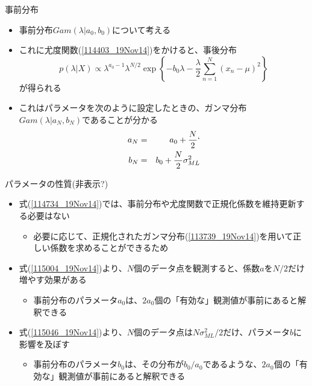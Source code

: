 \begin{frame}{事前分布}
 \begin{itemize}
  \item 事前分布$Gam(\lambda|a_0,b_0)$について考える
  \item これに尤度関数(\ref{114403_19Nov14})をかけると、事後分布
        \begin{equation}
         p(\lambda|X) \propto \lambda^{a_0-1}\lambda^{N/2}\exp\left\{-b_0\lambda-\frac{\lambda}{2}\sum_{n=1}^{N}(x_n-\mu)^2\right\}\label{114734_19Nov14}
        \end{equation}
        が得られる
  \item これはパラメータを次のように設定したときの、ガンマ分布$Gam(\lambda|a_N,b_N)$であることが分かる
        \begin{eqnarray}
         a_N&=& a_0 + \frac{N}{2}`\label{115004_19Nov14}\\
         b_N%
         &= & b_0+\frac{N}{2}\sigma^2_{ML}\label{115046_19Nov14}
        \end{eqnarray}
 \end{itemize}
\end{frame}

\begin{frame}{パラメータの性質(非表示?)}
 \begin{itemize}
  \item 式(\ref{114734_19Nov14})では、事前分布や尤度関数で正規化係数を維持更新する必要はない
        \begin{itemize}
         \item 必要に応じて、正規化されたガンマ分布(\ref{113739_19Nov14})を用いて正しい係数を求めることができるため
        \end{itemize}
  \item 式(\ref{115004_19Nov14})より、$N$個のデータ点を観測すると、係数$a$を$N/2$だけ増やす効果がある
        \begin{itemize}
         \item 事前分布のパラメータ$a_0$は、$2a_0$個の「有効な」観測値が事前にあると解釈できる
        \end{itemize}
  \item 式(\ref{115046_19Nov14})より、$N$個のデータ点は$N\sigma_{ML}^2/2$だけ、パラメータ$b$に影響を及ぼす
        \begin{itemize}
         \item 事前分布のパラメータ$b_0$は、その分布が$b_0/a_0$であるような、$2a_0$個の「有効な」観測値が事前にあると解釈できる
        \end{itemize}
 \end{itemize}
\end{frame}

